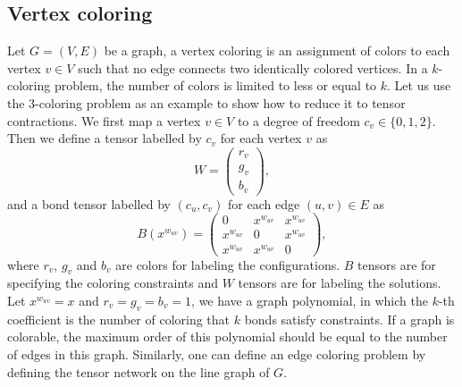 \documentclass[onefignum, onetabnum]{siamart190516}
\newcommand{\<}{\langle}
\renewcommand{\>}{\rangle}
\newcounter{example}
\begin{document}
\subsection{Vertex coloring}
Let $G=(V,E)$ be a graph, a vertex coloring is an assignment of colors to each vertex $v\in V$ such that no edge connects two identically colored vertices. 
In a $k$-coloring problem, the number of colors is limited to less or equal to $k$.
Let us use the 3-coloring problem as an example to show how to reduce it to tensor contractions.
We first map a vertex $v \in V$ to a degree of freedom $c_v\in\{0,1,2\}$.
Then we define a tensor labelled by $c_v$ for each vertex $v$ as
\begin{equation}
    W = \left(\begin{matrix}
        r_v\\
        g_v\\
        b_v
    \end{matrix}\right),
\end{equation}
and a bond tensor labelled by $(c_u, c_v) $ for each edge $(u, v) \in E$ as
\begin{equation}
    B(x^{w_{uv}}) = \left(\begin{matrix}
        0 & x^{w_{uv}} & x^{w_{uv}}\\
        x^{w_{uv}} & 0 & x^{w_{uv}}\\
        x^{w_{uv}} & x^{w_{uv}} & 0
    \end{matrix}\right),
\end{equation}
where $r_v$, $g_v$ and $b_v$ are colors for labeling the configurations. $B$ tensors are for specifying the coloring constraints and $W$ tensors are for labeling the solutions.
Let $x^{w_{uv}} = x$ and $r_v = g_v = b_v = 1$, we have a graph polynomial,
in which the $k$-th coefficient is the number of coloring that $k$ bonds satisfy constraints.
If a graph is colorable, the maximum order of this polynomial should be equal to the number of edges in this graph.
Similarly, one can define an edge coloring problem by defining the tensor network on the line graph of $G$.
\end{document}
